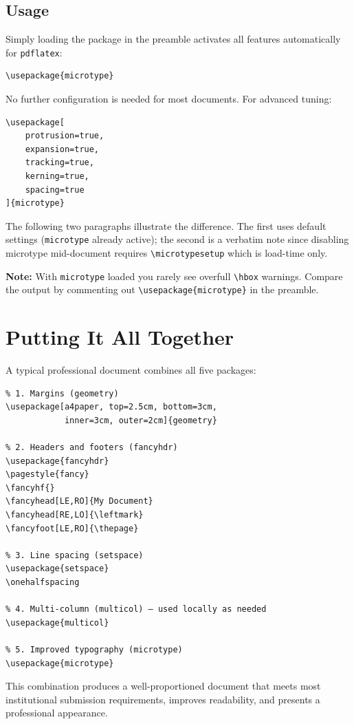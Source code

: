 \documentclass[12pt,a4paper,twoside]{article}
\begin{document}
\subsection{Usage}

Simply loading the package in the preamble activates all features
automatically for \texttt{pdflatex}:

\begin{verbatim}
\usepackage{microtype}
\end{verbatim}

No further configuration is needed for most documents. For advanced tuning:

\begin{verbatim}
\usepackage[
    protrusion=true,
    expansion=true,
    tracking=true,
    kerning=true,
    spacing=true
]{microtype}
\end{verbatim}

\medskip
The following two paragraphs illustrate the difference.
The first uses default settings (\texttt{microtype} already active);
the second is a verbatim note since disabling microtype mid-document
requires \texttt{\textbackslash microtypesetup} which is load-time only.

\lipsum[8]

\noindent\colorbox{yellow!30}{\parbox{0.97\linewidth}{\small
\textbf{Note:} With \texttt{microtype} loaded you rarely see overfull
\verb|\hbox| warnings.  Compare the output by commenting out
\verb|\usepackage{microtype}| in the preamble.}}


\section{Putting It All Together}
\label{sec:combined}

A typical professional document combines all five packages:

\begin{verbatim}
% 1. Margins (geometry)
\usepackage[a4paper, top=2.5cm, bottom=3cm,
            inner=3cm, outer=2cm]{geometry}

% 2. Headers and footers (fancyhdr)
\usepackage{fancyhdr}
\pagestyle{fancy}
\fancyhf{}
\fancyhead[LE,RO]{My Document}
\fancyhead[RE,LO]{\leftmark}
\fancyfoot[LE,RO]{\thepage}

% 3. Line spacing (setspace)
\usepackage{setspace}
\onehalfspacing

% 4. Multi-column (multicol) — used locally as needed
\usepackage{multicol}

% 5. Improved typography (microtype)
\usepackage{microtype}
\end{verbatim}

This combination produces a well-proportioned document that meets most
institutional submission requirements, improves readability, and presents
a professional appearance.
\end{document}
